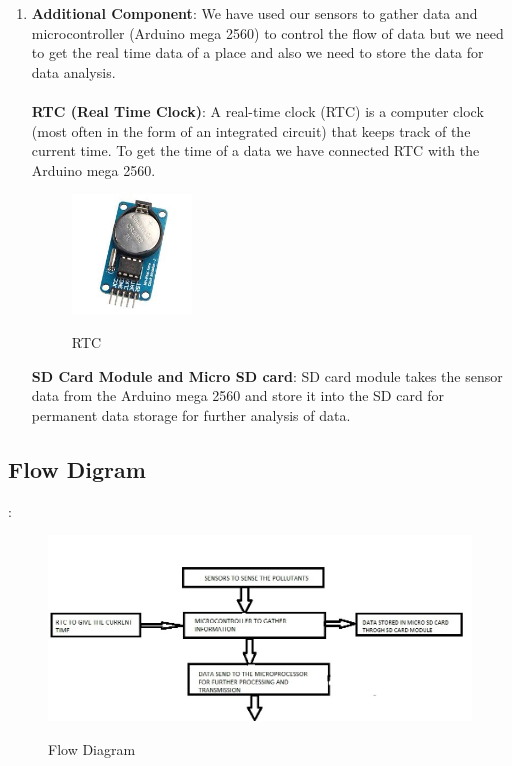 \begin{enumerate}
\item \textbf{Additional Component}:
We have used our sensors to gather data and microcontroller (Arduino mega 2560) to control the flow of data but we need to get the real time data of a place and also we need to store the data for data analysis.
\\
\\
\textbf{RTC (Real Time Clock)}: A real-time clock (RTC) is a computer clock (most often in the form of an integrated circuit) that keeps track of the current time. To get the time of a data we have connected RTC with the Arduino mega 2560.
\begin{figure}
\centering
\includegraphics[width=0.3\textwidth]{./rtc}\\[0.1in]
\label{fig: RTC}
\caption{RTC}
\end{figure}

\textbf{SD Card Module and Micro SD card}: SD card module takes the sensor data from the Arduino mega 2560 and store it into the SD card for permanent data storage for further analysis of data. 
\end{enumerate}

\subsection{Flow Digram}:
\begin{figure}
\centering
\includegraphics[width=1.0\textwidth]{./FLOW}\\[0.1in]
\label{fig: Flow diagram}
\caption{Flow Diagram}
\end{figure}

